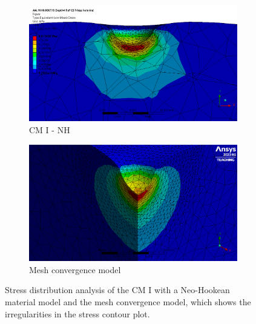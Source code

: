 \begin{figure}
    \centering
    \begin{subfigure}[b]{0.8\textwidth}
    \centering
    \includegraphics[width=\textwidth]{Images/computational/37CSNHstresshalfzoommesh.png}
    \caption{CM I - NH}
    \label{fig:cm1meshtotal}
    \end{subfigure}
    \vspace{0.3cm}
    \begin{subfigure}[b]{0.8\textwidth}
    \centering
    \includegraphics[width=\textwidth]{Images/computational/meshzoomstress.png}
    \caption{Mesh convergence model}
    \label{fig:cm1meshref}
    \end{subfigure}
    \hspace{0.3cm}
    \caption[Mesh convergence model I stress distribution]{Stress distribution analysis of the CM I with a Neo-Hookean material model and the mesh convergence model, which shows the irregularities in the stress contour plot.}
    \label{fig:stressdistributionanalysis}
\end{figure}
